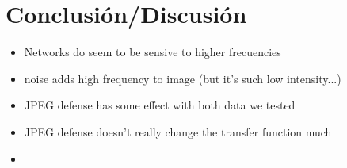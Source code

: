 \section{Conclusión/Discusión}
\begin{itemize}
    \item Networks do seem to be sensive to higher frecuencies
    \item noise adds high frequency to image (but it's such low intensity...)
    \item JPEG defense has some effect with both data we tested
    \item JPEG defense doesn't really change the transfer function much
    \item 
\end{itemize}